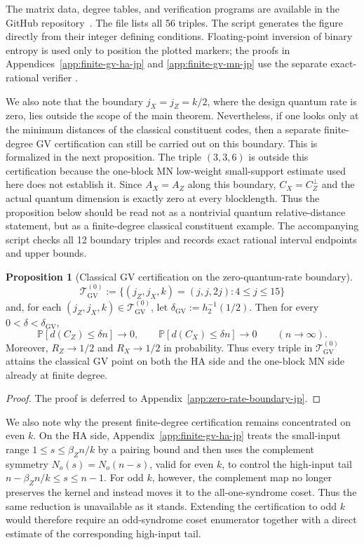 \documentclass[11pt]{article}
\theoremstyle{definition}
\newtheorem{proposition}[theorem]{Proposition}
\newcommand{\PP}{\mathbb P}
\newcommand{\h}{h_2}
\newcommand{\CZ}{C_Z}
\newcommand{\CX}{C_X}
\begin{document}
The matrix data, degree tables, and verification programs are available
in the GitHub repository~\cite{KasaiGVData26}.
The file  lists all 56 triples.
The script  generates the figure directly
from their integer defining conditions. Floating-point inversion of
binary entropy is used only to position the plotted markers; the
proofs in Appendices~\ref{app:finite-gv-ha-jp} and
\ref{app:finite-gv-mn-jp} use the separate exact-rational verifier
.

We also note that the boundary \(j_X=j_Z=k/2\), where the design quantum rate is zero, lies outside the scope of the main theorem. Nevertheless, if one looks only at the minimum distances of the classical constituent codes, then a separate finite-degree GV certification can still be carried out on this boundary. This is formalized in the next proposition. The triple \((3,3,6)\) is outside this certification because the one-block MN low-weight small-support estimate used here does not establish it. Since \(A_X=A_Z\) along this boundary, \(C_X=C_Z^\perp\) and the actual quantum dimension is exactly zero at every blocklength. Thus the proposition below should be read not as a nontrivial quantum relative-distance statement, but as a finite-degree classical constituent example. The accompanying script  checks all 12 boundary triples and records exact rational interval endpoints and upper bounds.

\begin{proposition}[Classical GV certification on the zero-quantum-rate boundary]\label{prop:zero-rate-boundary-jp}
\[
\mathcal T_{\mathrm{GV}}^{(0)}
:=
\{(j_Z,j_X,k)=(j,j,2j): 4\le j\le 15\}
\]
and, for each \((j_Z,j_X,k)\in\mathcal T_{\mathrm{GV}}^{(0)}\), let \(\delta_{\mathrm{GV}}:=\h^{-1}(1/2)\). Then for every \(0<\delta<\delta_{\mathrm{GV}}\),
\[
\PP[d(\CZ)\le \delta n]\to 0,
\qquad
\PP[d(\CX)\le \delta n]\to 0
\qquad (n\to\infty).
\]
Moreover, \(R_Z\to1/2\) and \(R_X\to1/2\) in probability. Thus every triple in \(\mathcal T_{\mathrm{GV}}^{(0)}\) attains the classical GV point on both the HA side and the one-block MN side already at finite degree.
\end{proposition}

\begin{proof}
The proof is deferred to Appendix~\ref{app:zero-rate-boundary-jp}.
\end{proof}

We also note why the present finite-degree certification remains concentrated on even \(k\). On the HA side, Appendix~\ref{app:finite-gv-ha-jp} treats the small-input range \(1\le s\le \beta_Z n/k\) by a pairing bound and then uses the complement symmetry \(N_o(s)=N_o(n-s)\), valid for even \(k\), to control the high-input tail \(n-\beta_Z n/k\le s\le n-1\). For odd \(k\), however, the complement map no longer preserves the kernel and instead moves it to the all-one-syndrome coset. Thus the same reduction is unavailable as it stands. Extending the certification to odd \(k\) would therefore require an odd-syndrome coset enumerator together with a direct estimate of the corresponding high-input tail.
\end{document}
